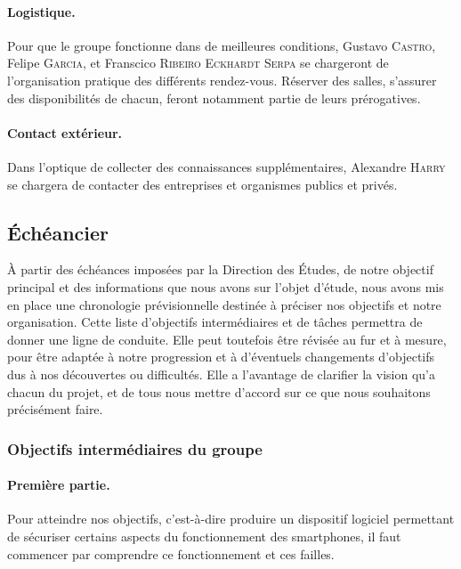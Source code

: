 \documentclass[a4paper, 12pt,twoside]{article}
\begin{document}
		\paragraph{Logistique. } Pour que le groupe fonctionne dans de meilleures conditions, \textcolor{bleu303}{Gustavo \textsc{Castro}}, \textcolor{bleu303}{Felipe \textsc{Garcia}}, et \textcolor{bleu303}{Franscico \textsc{Ribeiro Eckhardt Serpa}} se chargeront de l'organisation pratique des différents rendez-vous. Réserver des salles, s'assurer des disponibilités de chacun, feront notamment partie de leurs prérogatives.
		
		\paragraph{Contact extérieur. }  Dans l'optique de collecter des connaissances supplémentaires, \textcolor{bleu303}{Alexandre \textsc{Harry}} se chargera de contacter des entreprises et organismes publics et privés.
		
	\subsection{Échéancier}
	
	À partir des échéances imposées par la Direction des Études, de notre objectif principal et des informations que nous avons sur l'objet d'étude, nous avons mis en place une chronologie prévisionnelle destinée à préciser nos objectifs et notre organisation. Cette liste d'objectifs intermédiaires et de tâches permettra de donner une ligne de conduite. Elle peut toutefois être révisée au fur et à mesure, pour être adaptée à notre progression et à d'éventuels changements d'objectifs dus à nos découvertes ou difficultés. Elle a l'avantage de clarifier la vision qu'a chacun du projet, et de tous nous mettre d'accord sur ce que nous souhaitons précisément faire.
	
		\subsubsection{Objectifs intermédiaires du groupe}
		
		\paragraph{Première partie. } Pour atteindre nos objectifs, c'est-à-dire produire un dispositif logiciel permettant de sécuriser certains aspects du fonctionnement des smartphones, il faut commencer par comprendre ce fonctionnement et ces failles.
		
\end{document}
